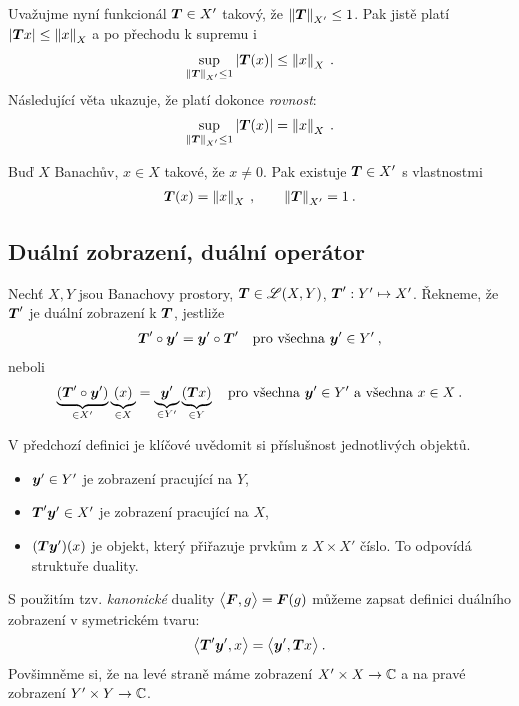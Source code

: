 Uvažujme nyní funkcionál $\boldsymbol{T} \in X'$ takový, že $\left\lVert\boldsymbol{T}\right\rVert_{X'} \leq 1$. Pak jistě platí $|\boldsymbol{T} x| \leq \left\lVert x\right\rVert_X$ a po přechodu k supremu i \begin{align*}
    \sup_{\left\lVert\boldsymbol{T}\right\rVert_{X'} \leq 1} |\boldsymbol{T}(x)| \leq \left\lVert x\right\rVert_X \:.
\end{align*}
Následující věta ukazuje, že platí dokonce \textit{rovnost}: \begin{align*}
    \sup_{\left\lVert\boldsymbol{T}\right\rVert_{X'} \leq 1} |\boldsymbol{T}(x)| = \left\lVert x\right\rVert_X \:.
\end{align*}

\begin{theorem}
Buď $X$ Banachův, $x \in X$ takové, že $x \neq 0$. Pak existuje $\boldsymbol{T} \in X'$ s vlastnostmi \begin{align*}
    \boldsymbol{T}(x) = \left\lVert x\right\rVert_X \:, \qquad \left\lVert\boldsymbol{T}\right\rVert_{X'} = 1 \:.
\end{align*}
\end{theorem}

\subsection{Duální zobrazení, duální operátor}

\begin{definition}
Nechť $X,Y$ jsou Banachovy prostory, $\boldsymbol{T} \in \mathscr{L} (X,Y)$, $\boldsymbol{T}' : Y' \mapsto X'$. Řekneme, že $\boldsymbol{T}'$ je duální zobrazení k $\boldsymbol{T}$, jestliže \begin{align*}
    \boldsymbol{T}' \circ \boldsymbol{y}' = \boldsymbol{y}' \circ \boldsymbol{T}' \quad \text{pro všechna } \boldsymbol{y}' \in Y' \:,
\end{align*}
neboli \begin{align*}
    \underbrace{(\boldsymbol{T}' \circ \boldsymbol{y}')}_{\in X'} \underbrace{(x)}_{\in X} = \underbrace{\boldsymbol{y}'}_{\in Y'} \underbrace{(\boldsymbol{T} x)}_{\in Y} \quad \text{pro všechna } \boldsymbol{y}' \in Y' \text{ a všechna } x \in X \:.
\end{align*}
\end{definition}

V předchozí definici je klíčové uvědomit si příslušnost jednotlivých objektů. \begin{itemize}
    \item $\boldsymbol{y}' \in Y'$ je zobrazení pracující na $Y$,
    \item $\boldsymbol{T}' \boldsymbol{y}' \in X'$ je zobrazení pracující na $X$,
    \item $(\boldsymbol{T} \boldsymbol{y}')(x)$ je objekt, který přiřazuje prvkům z $X \times X'$ číslo. To odpovídá struktuře duality.
\end{itemize}
S použitím tzv. \textit{kanonické} duality $\big< \boldsymbol{F}, g \big> = \boldsymbol{F}(g)$ můžeme zapsat definici duálního zobrazení v symetrickém tvaru:
\begin{align*}
    \big< \boldsymbol{T}' \boldsymbol{y}', x \big> = \big< \boldsymbol{y}', \boldsymbol{T} x \big> \: .
\end{align*}
Povšimněme si, že na levé straně máme zobrazení $X' \times X \to \mathbb{C}$ a na pravé zobrazení $Y' \times Y \to \mathbb{C}$.

